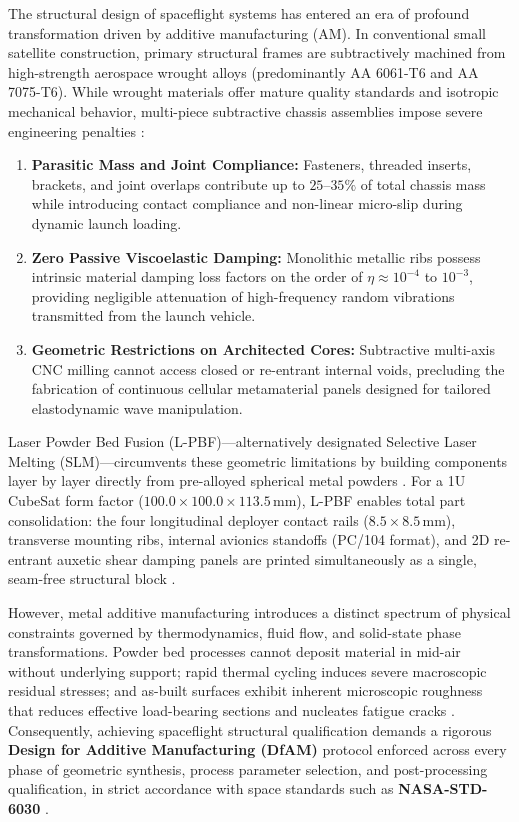 The structural design of spaceflight systems has entered an era of profound transformation driven by additive manufacturing (AM). In conventional small satellite construction, primary structural frames are subtractively machined from high-strength aerospace wrought alloys (predominantly AA 6061-T6 and AA 7075-T6). While wrought materials offer mature quality standards and isotropic mechanical behavior, multi-piece subtractive chassis assemblies impose severe engineering penalties \cite{carrara2017,khan2024}:
\begin{enumerate}
\item \textbf{Parasitic Mass and Joint Compliance:} Fasteners, threaded inserts, brackets, and joint overlaps contribute up to $25\text{--}35\%$ of total chassis mass while introducing contact compliance and non-linear micro-slip during dynamic launch loading.
\item \textbf{Zero Passive Viscoelastic Damping:} Monolithic metallic ribs possess intrinsic material damping loss factors on the order of $\eta \approx 10^{-4}$ to $10^{-3}$, providing negligible attenuation of high-frequency random vibrations transmitted from the launch vehicle.
\item \textbf{Geometric Restrictions on Architected Cores:} Subtractive multi-axis CNC milling cannot access closed or re-entrant internal voids, precluding the fabrication of continuous cellular metamaterial panels designed for tailored elastodynamic wave manipulation.
\end{enumerate}

Laser Powder Bed Fusion (L-PBF)—alternatively designated Selective Laser Melting (SLM)—circumvents these geometric limitations by building components layer by layer directly from pre-alloyed spherical metal powders \cite{thijs2013,trevisan2017}. For a 1U CubeSat form factor ($100.0 \times 100.0 \times 113.5\,\text{mm}$), L-PBF enables total part consolidation: the four longitudinal deployer contact rails ($8.5 \times 8.5\,\text{mm}$), transverse mounting ribs, internal avionics standoffs (PC/104 format), and 2D re-entrant auxetic shear damping panels are printed simultaneously as a single, seam-free structural block \cite{alomarah2017}.

However, metal additive manufacturing introduces a distinct spectrum of physical constraints governed by thermodynamics, fluid flow, and solid-state phase transformations. Powder bed processes cannot deposit material in mid-air without underlying support; rapid thermal cycling induces severe macroscopic residual stresses; and as-built surfaces exhibit inherent microscopic roughness that reduces effective load-bearing sections and nucleates fatigue cracks \cite{brandl2012,collini2024}. Consequently, achieving spaceflight structural qualification demands a rigorous \textbf{Design for Additive Manufacturing (DfAM)} protocol enforced across every phase of geometric synthesis, process parameter selection, and post-processing qualification, in strict accordance with space standards such as \textbf{NASA-STD-6030} \cite{nasa2021}.

